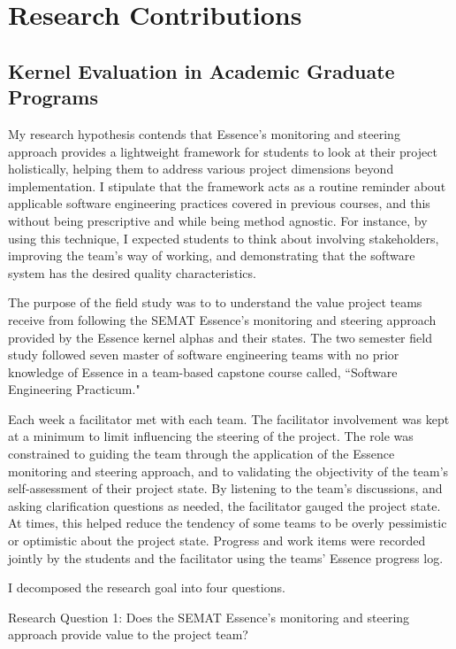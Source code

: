 \documentclass[preprint,12pt,3p]{elsarticle}
\begin{document}
\section{Research Contributions}

\subsection{Kernel Evaluation in Academic Graduate Programs}
\label{CMUFieldStudy}
My research hypothesis contends that Essence’s monitoring and steering approach provides a lightweight framework for students to look at their project holistically, helping them to address various project dimensions beyond implementation. I stipulate that the framework acts as a routine reminder about applicable software engineering practices covered in previous courses, and this without being prescriptive and while being method agnostic. For instance, by using this technique, I expected students to think about involving stakeholders, improving the team’s way of working, and demonstrating that the software system has the desired quality characteristics.

The purpose of the field study \cite{ICSE2014} was to to understand the value project teams receive from following the SEMAT Essence’s monitoring and steering approach provided by the Essence kernel alphas and their states.  The two semester field study followed seven master of software engineering teams with no prior knowledge of Essence in a team-based capstone course called, ``Software Engineering Practicum." 

Each week a facilitator met with each team. The facilitator involvement was kept at a minimum to limit influencing the steering of the project. The role was constrained to guiding the team through the application of the Essence monitoring and steering approach, and to validating the objectivity of the team’s self-assessment of their project state. By listening to the team’s discussions, and asking clarification questions as needed, the facilitator gauged the project state. At times, this helped reduce the tendency of some teams to be overly pessimistic or optimistic about the project state. Progress and work items were recorded jointly by the students and the facilitator using the teams’ Essence progress log.

I decomposed the research goal into four questions.

Research Question 1: Does the SEMAT Essence’s monitoring and steering approach provide value to the project team?
\end{document}
